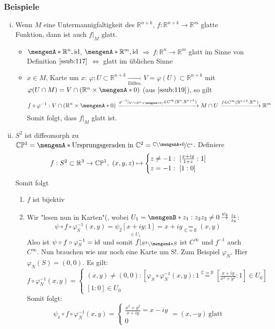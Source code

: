 \subsubsection{Beispiele}
\label{ssub:120}
\begin{enumerate}[(i)]
\item Wenn $M$ eine Untermannigfaltigkeit des $\mathds{R}^{n+k}$, $f:\mathds{R}^{n+k}\to \mathds{R}^m$ glatte Funktion, dann ist auch $f\vert_M$ glatt.
\begin{itemize}
\item $\set{\mathds{R}^n,\id}$, $\set{\mathds{R}^m,\id}$ $\Rightarrow\ f:\mathds{R}^n\to \mathds{R}^m$ glatt im Sinne von Definition $\ref{ssub:117}$ $\Leftrightarrow$ glatt im üblichen Sinne
\item $x\in M$, Karte um $x$: $\varphi: U\subset \mathds{R}^{n+k} \underset{\text{Diffeo.}}{\to} V = \varphi(U)\subset \mathds{R}^{n+k}$ mit $\varphi(U\cap M) = V\cap (\mathds{R}^n\times \set{0})$ (aus $\ref{ssub:119}$), so gilt
\[
f\circ \varphi^{-1}: V\cap (\mathds{R}^n\times \set{0}) \xrightarrow{\varphi^{-1} \vert_{V\cap (\mathds{R}^n\times \set{0})}\in C^{\infty}(\mathds{R}^n,\mathds{R}^{n+k})} 
M\cap U \xrightarrow{f \in C^{\infty}(\mathds{R}^{n+k},\mathds{R}^m)} \mathds{R}^m
\]
Somit folgt, dass $f\vert_M$ glatt ist. 
\end{itemize}
\item $S^2$ ist diffeomorph zu $\mathds{C}\mathds{P}^1 = \set{\text{Ursprungsgeraden in}\ \mathds{C}^2} = \nicefrac{\mathds{C}\backslash \set{0}}{\mathds{C}^*}$. Definiere 
\[
f: S^2\subset \mathbb{R}^3 \to \mathbb{C}\mathbb{P}^1,\ (x,y,z) \mapsto
\begin{cases}
z\neq -1:\ [\frac{x+iy}{1+z}:1]\\
z = -1:\ [1:0]
\end{cases}
\]
Somit folgt
\begin{enumerate}[(1)]
\item $f$ ist bijektiv
\item Wir "lesen nun in Karten"(, wobei $U_1 = \set[ z_1:z_2 ]{z_2\neq 0} \overset{\psi_2}{\to} \frac{z_1}{z_2}$:
\[
\psi \circ f \circ \varphi_S^{-1}(x,y) = \underset{\in U_1}{\psi_2 [x+iy:1]} = x + iy \underset{\mathds{C} \simeq \mathds{R}}{=} (x,y)
\]
Also ist $\psi \circ f \circ \varphi_S^{-1} = \operatorname{id}$ und somit $f \vert_{S^2\backslash\set{S}}$ ist $C^{\infty}$ und $f^{-1}$ auch $C^{\infty}$. Nun brauchen wie nur noch eine Karte um S!. Zum Beispiel $\varphi_N$. Hier $\varphi_N(S) = (0,0)$. Es gilt:
\[
	f\circ \varphi_N^{-1}(x,y) = 
	\begin{cases}
		(x,y) \neq (0,0): [\varphi_S \circ \varphi_N^{-1}(x,y):1 \overset{\mathds{C} \simeq \mathds{R}}{=} [\frac{x+iy}{x^2+y^2}:1] \in U_0]\\
	[1:0] \in U_0 
	\end{cases}
\]
Somit folgt:
\[
	\psi_1 \circ f \circ \varphi_N^{-1}(x,y) =
	\begin{cases}
		\frac{x^2+y^2}{x+iy} = x-iy\\
		0
	\end{cases}
	= (x,-y)\ \text{glatt}
\]
\end{enumerate}
\end{enumerate}

